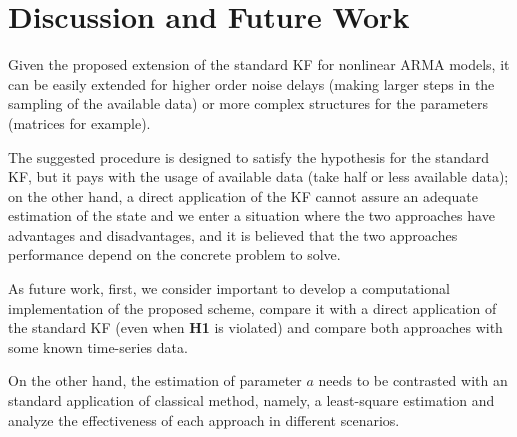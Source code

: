 \section{Discussion and Future Work}\label{sec:conc}
Given the proposed extension of the standard KF for nonlinear ARMA models, it can be easily extended for higher order noise delays (making larger steps in the sampling of the available data) or more complex structures for the parameters (matrices for example).

The suggested procedure is designed to satisfy the hypothesis for the standard KF, but it pays with the usage of available data (take half or less available data); on the other hand, a direct application of the KF cannot assure an adequate estimation of the state and we enter a situation where the two approaches have advantages and disadvantages, and it is believed that the two approaches performance depend on the concrete problem to solve.

As future work, first, we consider important to develop a computational implementation of the proposed scheme, compare it with a direct application of the standard KF (even when \textbf{H1} is violated) and compare both approaches with some known time-series data.

On the other hand, the estimation of parameter $a$ needs to be contrasted with an standard application of classical method, namely, a least-square estimation and analyze the effectiveness of each approach in different scenarios.
